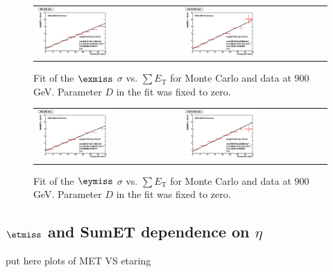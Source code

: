 \begin{figure}[h!]
 \centering
 \begin{tabular}{ll}
  \includegraphics[width=0.5\textwidth]{plots_DataVsMC_MB_900GeV/final_metxsigma_sumet_MC_900.eps} &
  \includegraphics[width=0.5\textwidth]{plots_DataVsMC_MB_900GeV/final_metxsigma_sumet_DATA_900.eps} \\
 \end{tabular}
 \caption{\small Fit of the $\exmiss$ $\sigma$ vs. $\sum E_\text{T}$ for Monte Carlo and data at $900$ GeV. Parameter $D$ in the fit was fixed
          to zero.\label{fig:MExSigma_vs_SumET_900_fit}}
\end{figure}

\begin{figure}[h!]
 \centering
 \begin{tabular}{ll}
  \includegraphics[width=0.5\textwidth]{plots_DataVsMC_MB_900GeV/final_metysigma_sumet_MC_900.eps} &
  \includegraphics[width=0.5\textwidth]{plots_DataVsMC_MB_900GeV/final_metysigma_sumet_DATA_900.eps} \\
 \end{tabular}
 \caption{\small Fit of the $\eymiss$ $\sigma$ vs. $\sum E_\text{T}$ for Monte Carlo and data at $900$ GeV. Parameter $D$ in the fit was fixed
          to zero.\label{fig:MExSigma_vs_SumET_900_fit}}
\end{figure}


\subsection{$\etmiss$ and SumET dependence on $\eta$}
put here plots of MET VS etaring
